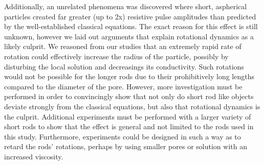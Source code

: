 		Additionally, an unrelated phenomena was discovered where short, aspherical particles created far greater (up to 2x) resistive pulse amplitudes than predicted by the well-established classical equations. The exact reason for this effect is still unknown, however we laid out arguments that explain rotational dynamics as a likely culprit. We reasoned from our studies that an extremely rapid rate of rotation could effectively increase the radius of the particle, possibly by disturbing the local solution and decreasings its conductivity. Such rotations would not be possible for the longer rods due to their prohibitively long lengths compared to the diameter of the pore. However, more investigation must be performed in order to convincingly show that not only do short rod like objects deviate strongly from the classical equations, but also that rotational dynamics is the culprit. Additional experiments must be performed with a larger variety of short rods to show that the effect is general and not limited to the rods used in this study. Furthermore, experiments could be designed in such a way as to retard the rods' rotations, perhaps by using smaller pores or solution with an increased viscosity.

	
	
		
		
		
	

	




